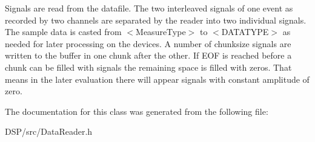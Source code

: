 Signals are read from the datafile. The two interleaved signals of one event as recorded by two channels are separated by the reader into two individual signals. The sample data is casted from $<$\-Measure\-Type$>$ to $<$\-D\-A\-T\-A\-T\-Y\-P\-E$>$ as needed for later processing on the devices. A number of chunksize signals are written to the buffer in one chunk after the other. If E\-O\-F is reached before a chunk can be filled with signals the remaining space is filled with zeros. That means in the later evaluation there will appear signals with constant amplitude of zero. 

The documentation for this class was generated from the following file\-:\begin{DoxyCompactItemize}
\item 
D\-S\-P/src/Data\-Reader.\-h\end{DoxyCompactItemize}
